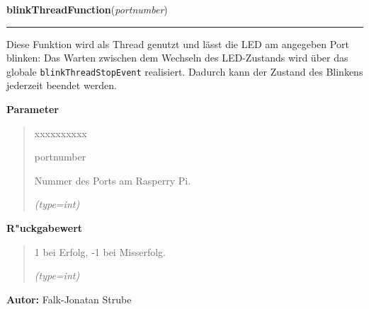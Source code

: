 \hspace{.8\funcindent}\begin{boxedminipage}{\funcwidth}

    \raggedright \textbf{blinkThreadFunction}(\textit{portnumber})

    \vspace{-1.5ex}

    \rule{\textwidth}{0.5\fboxrule}
\setlength{\parskip}{2ex}
    Diese Funktion wird als Thread genutzt und lässt die LED am angegeben 
    Port blinken: Das Warten zwischen dem Wechseln des LED-Zustands wird 
    über das globale \texttt{blinkThreadStopEvent} realisiert. Dadurch kann
    der Zustand des Blinkens jederzeit beendet werden.

\setlength{\parskip}{1ex}
      \textbf{Parameter}
      \vspace{-1ex}

      \begin{quote}
        \begin{Ventry}{xxxxxxxxxx}

          \item[portnumber]

          Nummer des Ports am Rasperry Pi.

            {\it (type=int)}

        \end{Ventry}

      \end{quote}

      \textbf{R"uckgabewert}
    \vspace{-1ex}

      \begin{quote}
      1 bei Erfolg, -1 bei Misserfolg.

      {\it (type=int)}

      \end{quote}

\textbf{Autor:} Falk-Jonatan Strube



    \end{boxedminipage}

    \label{ledleuchtturm:ledFunc:killBlinkThread}

    \vspace{0.5ex}

